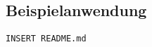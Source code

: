 \documentclass[hidelinks, a4paper, 11pt]{article} %
\begin{document}
\subsection{Beispielanwendung}

\begin{lstlisting}
INSERT README.md
\end{lstlisting}




\renewcommand{\refname}{Referenzen}

\newpage



\end{document}
